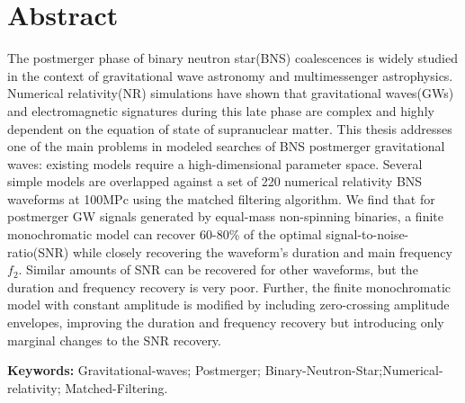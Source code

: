 \chapter*{Abstract}

The postmerger phase of binary neutron star(BNS) coalescences is widely studied in the context of gravitational wave astronomy and multimessenger astrophysics. Numerical relativity(NR) simulations have shown that gravitational waves(GWs) and electromagnetic signatures during this late phase are complex and highly dependent on the equation of state of supranuclear matter. This thesis addresses one of the main problems in modeled searches of BNS postmerger gravitational waves: existing models require a high-dimensional parameter space. Several simple models are overlapped against a set of 220 numerical relativity BNS waveforms at 100MPc using the matched filtering algorithm. We find that for postmerger GW signals generated by equal-mass non-spinning binaries, a finite monochromatic model can recover 60-80\% of the optimal signal-to-noise-ratio(SNR) while closely recovering the waveform's duration and main frequency $f_2$. Similar amounts of SNR can be recovered for other waveforms, but the duration and frequency recovery is very poor. Further, the finite monochromatic model with constant amplitude is modified by including zero-crossing amplitude envelopes, improving the duration and frequency recovery but introducing only marginal changes to the SNR recovery.







\vspace{1cm}
\textbf{Keywords:} Gravitational-waves; Postmerger; Binary-Neutron-Star;Numerical-relativity; Matched-Filtering.